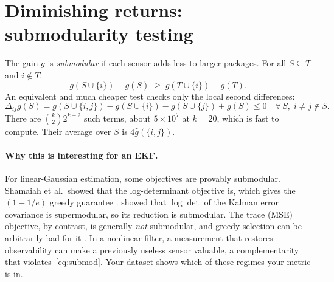 \documentclass[11pt]{article}
\begin{document}
\section{Diminishing returns: submodularity testing}\label{sec:submod}

The gain $g$ is \emph{submodular} if each sensor adds less to larger packages.
For all $S\subseteq T$ and $i\notin T$,
\begin{equation}\label{eq:submod}
  g(S\cup\{i\})-g(S)\;\ge\;g(T\cup\{i\})-g(T).
\end{equation}
An equivalent and much cheaper test checks only the local second differences:
\begin{equation}\label{eq:secdiff}
  \Delta_{ij}g(S)=g(S\cup\{i,j\})-g(S\cup\{i\})-g(S\cup\{j\})+g(S)\le 0
  \quad\forall\,S,\;i\neq j\notin S.
\end{equation}
There are $\binom{k}{2}2^{k-2}$ such terms, about $5\times10^7$ at $k=20$, which is fast to compute.
Their average over $S$ is $4\widehat{g}(\{i,j\})$.

\paragraph{Why this is interesting for an EKF.}
For linear-Gaussian estimation, some objectives are provably submodular.
Shamaiah et al.\ showed that the log-determinant objective is, which gives the $(1-1/e)$ greedy guarantee \parencite{Nemhauser1978,Shamaiah2010}.
\textcite{Tzoumas2016} showed that $\log\det$ of the Kalman error covariance is supermodular, so its reduction is submodular.
The trace (MSE) objective, by contrast, is generally \emph{not} submodular, and greedy selection can be arbitrarily bad for it \parencite{Ye2018}.
In a nonlinear filter, a measurement that restores observability can make a previously useless sensor valuable, a complementarity that violates~\eqref{eq:submod}.
Your dataset shows which of these regimes your metric is in.
\end{document}
